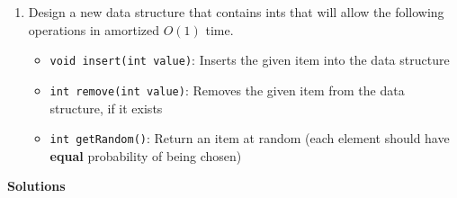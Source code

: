 \documentclass{article}
\begin{document}
\begin{enumerate}
\item Design a new data structure that contains ints that will allow the following operations in amortized $O(1)$ time.
\begin{itemize}
    \item \texttt{void insert(int value)}: Inserts the given item into the data structure
    \item \texttt{int remove(int value)}: Removes the given item from the data structure, if it exists
    \item \texttt{int getRandom()}: Return an item at random (each element should have \textbf{equal} probability of being chosen)
\end{itemize}

\end{enumerate}

\clearpage


\begin{center}
    \textbf{Solutions}
\end{center}
\end{document}
